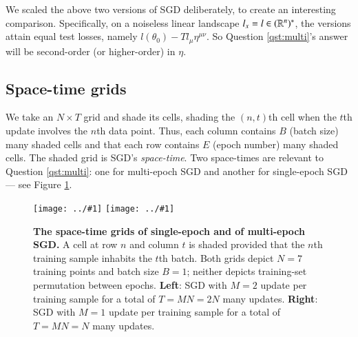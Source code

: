 \documentclass[openany, notitlepage, justified]{tufte-book}
\theoremstyle{plain}
\theoremstyle{definition}
\newcommand{\plotmooh}[3]{\texttt{[image: ../\#1]}}
\begin{document}
        We scaled the above two versions of SGD deliberately, to create an
        interesting comparison.
        Specifically, on a noiseless
        linear landscape $l_x=l \in (\mathbb{R}^n)^*$, the versions
        attain equal test losses, namely $l(\theta_0) - T l_\mu \eta^{\mu\nu}$.
        So Question \ref{qst:multi}'s answer will be second-order (or
        higher-order) in $\eta$.

        \subsection{Space-time grids}
            We take an $N\times T$ grid and shade its cells, shading the
            $(n,t)$th cell when the $t$th update involves the $n$th data point.
            Thus, each column contains $B$ (batch size) many shaded cells and
            that each row contains $E$ (epoch number) many shaded cells.
            The shaded grid is SGD's \emph{space-time}.
            Two space-times are relevant to Question \ref{qst:multi}: one for
            multi-epoch SGD and another for single-epoch SGD --- see Figure
            \ref{fig:spacetimes-epoch}.
            \begin{figure} 
                \centering
                \plotmooh{diagrams/spacetime-b1-e2-nosh}{}{0.35\columnwidth} 
                \plotmooh{diagrams/spacetime-b1-e1-nosh}{}{0.35\columnwidth} 
                \caption{
                    \textbf{The space-time grids of single-epoch and of
                    multi-epoch SGD.}  A cell at row $n$ and column $t$ is
                    shaded provided that the $n$th training sample inhabits the
                    $t$th batch.  Both grids depict $N=7$
                    training points and batch size $B=1$; neither
                    depicts training-set permutation between epochs.
                    \newline
                    \textbf{Left}:
                        SGD with $M=2$ update per training sample for a total
                        of $T = MN = 2N$ many updates.
                    \newline
                    \textbf{Right}:
                        SGD with $M=1$ update per training sample for a total
                        of $T = MN = N$ many updates.
                }
                \label{fig:spacetimes-epoch}
            \end{figure}
\end{document}
